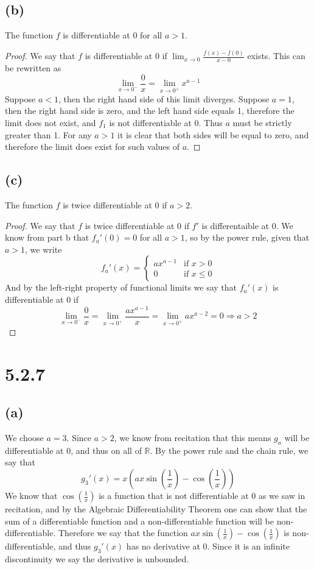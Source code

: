 \documentclass{article}
\begin{document}
\subsection*{(b)}
The function $f$ is differentiable at 0 for all $a >1$.
\begin{proof}
We say that $f$ is differentiable at 0 if $\lim_{x \rightarrow 0} \frac{f(x) - f(0)}{x - 0}$ exists. This can be rewritten as
\[  \lim_{x \rightarrow 0^-}\frac{0}{x}= \lim_{x \rightarrow 0^+} x^{a-1} \]
Suppose $a < 1$, then the right hand side of this limit diverges. Suppose $a = 1$, then the right hand side is zero, and the left hand side equals 1, therefore the limit does not exist, and $f_1$ is not differentiable at 0. Thus $a$ must be strictly greater than 1. For any $a > 1$ it is clear that both sides will be equal to zero, and therefore the limit does exist for such values of $a$.
\end{proof}

\subsection*{(c)}
The function $f$ is twice differentiable at 0 if $a>2$.
\begin{proof}
We say that $f$ is twice differentiable at 0 if $f'$ is differentaible at 0. We know from part b that $f_a'(0) = 0$ for all $a>1$, so by the power rule, given that $a>1$, we write
   \[ \displaystyle f_a'(x) = \begin{cases}
     ax^{a-1} & \text{if $x >0$} \\ 
     0& \text{if $x \leqslant 0$} 
     \end{cases}\]
And by the left-right property of functional limits we say that $f_a'(x)$ is differentiable at 0 if 
\[  \lim_{x \rightarrow 0^-}\frac{0}{x}= \lim_{x \rightarrow 0^+} \frac{ax^{a-1}}{x} =\lim_{x \rightarrow 0^+} ax^{a-2}   = 0 \Longrightarrow a > 2 \]
\end{proof}

\section*{5.2.7}
\subsection*{(a)}
We choose $a =3$. Since $a >2$, we know from recitation that this means $g_a$ will be differentiable at 0, and thus on all of $\mathbb{R}$. By the power rule and the chain rule, we say that 
\[ g_3'(x) = x \left(ax \sin\left(\frac{1}{x}\right) - \cos\left(\frac{1}{x}\right)\right)\]
We know that $\cos\left(\frac{1}{x}\right)$ is a function that is not differentiable at 0 as we saw in recitation, and by the Algebraic Differentiability Theorem one can show that the sum of a differentiable function and a non-differentiable function will be non-differentiable. Therefore we say that the function $ax \sin\left(\frac{1}{x}\right) - \cos\left(\frac{1}{x}\right)$ is non-differentiable, and thus $g_3'(x)$ has no derivative at 0. Since it is an infinite discontinuity we say the derivative is unbounded.
\end{document}
